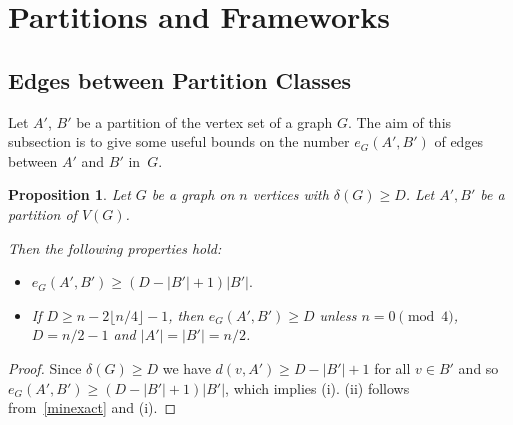 \documentclass{memo-l}
\newtheorem{prop}[firstthm]{Proposition}
\def\COMMENT#1{}
\numberwithin{section}{chapter}
\numberwithin{equation}{section}
\numberwithin{firstthm}{section}
\numberwithin{figure}{section}
\begin{document}
\section{Partitions and Frameworks}\label{sec:new}

\subsection{Edges between Partition Classes}

Let $A'$, $B'$ be a partition of the vertex set of a graph $G$. 
The aim of this subsection is to give some useful bounds on the number $e_G(A',B')$ of edges between $A'$ and $B'$ in~$G$.

\begin{prop} \label{prp:e(A',B')}
Let $G$ be a graph on $n$ vertices with $\delta(G) \ge D$.
Let $A',B'$ be a partition of $V(G)$.%
    \COMMENT{Daniela: deleted "If $|A'|\ge |B'|$" in (i) since it is not needed}
Then the following properties hold:
\begin{itemize}
\item[{\rm (i)}] $e_G(A', B')  \ge  (D - |B'|+1) |B'|. $ 
\item[{\rm (ii)}] If $D \geq n - 2\lfloor n/4 \rfloor -1$, then $e_G (A',B') \geq D$ unless
$n = 0 \pmod4$, $D = n/2 -1$ and $|A'| = |B'| = n/2$.
\end{itemize} 
\end{prop}

\begin{proof}
Since $\delta(G) \ge D$ we have $d(v,A') \ge  D - |B'|+1$ for all $v \in B'$ and so $e_G(A', B') \ge  (D - |B'|+1) |B'|$,
which implies (i). (ii) follows from~\eqref{minexact} and (i).%
\COMMENT{Without loss of generality, $|A'|\ge |B'|$. $(D - |B'|+1) |B'|$ is a quadratic function in $|B'|$ which is maximized if $|B'|=(D+1)/2$. So we have to check whether
$(D - |B'|+1) |B'|\ge D$ if $|B'|=1$ and if $|B'|=\lfloor n/2\rfloor$. The former is always the case. The latter holds unless
$n = 0 \pmod4$, $D = n/2 -1$ and $|A'| = |B'| = n/2$.}
\end{proof}
\end{document}
